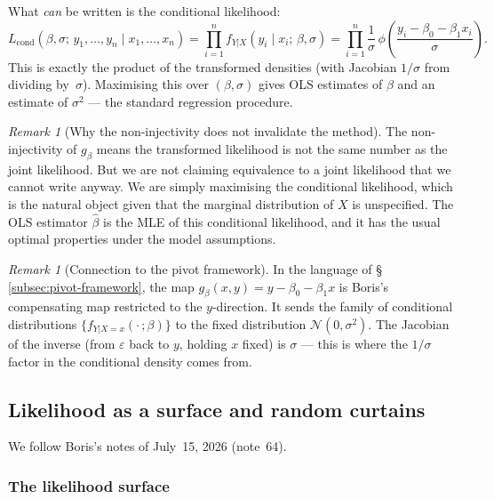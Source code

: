 \documentclass[a4paper,oneside,12pt]{extarticle}
\theoremstyle{plain}
\theoremstyle{definition}
\theoremstyle{remark}
\newtheorem{remark}[proposition]{Remark}
\begin{document}
What \emph{can} be written is the conditional likelihood:
\[
  L_{\mathrm{cond}}(\beta,\sigma;\,y_1,\ldots,y_n \mid x_1,\ldots,x_n)
  = \prod_{i=1}^n f_{Y|X}(y_i \mid x_i;\,\beta,\sigma)
  = \prod_{i=1}^n \frac{1}{\sigma}\,
    \phi\!\left(\frac{y_i - \beta_0 - \beta_1 x_i}{\sigma}\right).
\]
This is exactly the product of the transformed densities (with
Jacobian $1/\sigma$ from dividing by~$\sigma$).  Maximising this
over $(\beta,\sigma)$ gives OLS estimates of $\beta$ and an
estimate of $\sigma^2$ --- the standard regression procedure.

\begin{remark}[Why the non-injectivity does not invalidate the method]
The non-injectivity of $g_\beta$ means the transformed likelihood
is not the same number as the joint likelihood.  But we are not
claiming equivalence to a joint likelihood that we cannot write
anyway.  We are simply maximising the conditional likelihood, which
is the natural object given that the marginal distribution of $X$
is unspecified.  The OLS estimator $\hat\beta$ is the MLE of this
conditional likelihood, and it has the usual optimal properties
under the model assumptions.
\end{remark}

\begin{remark}[Connection to the pivot framework]
In the language of §\,\ref{subsec:pivot-framework}, the map
$g_\beta(x,y) = y - \beta_0 - \beta_1 x$ is Boris's compensating
map restricted to the $y$-direction.  It sends the family of
conditional distributions $\{f_{Y|X=x}(\cdot\,;\beta)\}$ to the
fixed distribution $\mathcal{N}(0,\sigma^2)$.  The Jacobian of
the inverse (from $\varepsilon$ back to $y$, holding $x$ fixed)
is $\sigma$ --- this is where the $1/\sigma$ factor in the
conditional density comes from.
\end{remark}


\subsection{Likelihood as a surface and random curtains}
\label{subsec:random-curves}

We follow Boris's notes of July~15, 2026 (note~64).

\subsubsection*{The likelihood surface}
\end{document}
